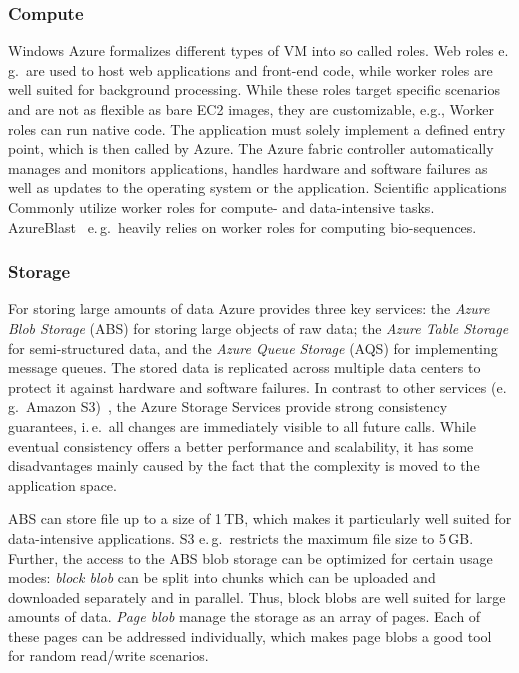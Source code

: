 \documentclass[conference,final]{IEEEtran}
\begin{document}
\subsubsection{Compute}

Windows Azure formalizes different types of VM into so called
roles. Web roles e.\,g.\ are used to host web applications and
front-end code, while worker roles are well suited for background
processing. While these roles target specific scenarios and are not as
flexible as bare EC2 images, they are customizable, %
e.g., Worker roles can run native code. The application must solely
implement a defined entry point, which is then called by Azure. The
Azure fabric controller automatically manages and monitors
applications, handles hardware and software failures as well as
updates to the operating system or the application.  Scientific
applications Commonly utilize worker roles for compute- and
data-intensive tasks. AzureBlast~\cite{azure_blast} e.\,g.\ heavily
relies on worker roles for computing bio-sequences.

\subsubsection{Storage}

For storing large amounts of data Azure provides three key services:
the \emph{Azure Blob Storage} (ABS) for storing large objects of raw
data; the \emph{Azure Table Storage} for semi-structured data, and the
\emph{Azure Queue Storage} (AQS) for implementing message queues.  The
stored data is %
replicated across multiple data centers to protect it against hardware
and software failures. In contrast to other services (e.\,g.\ Amazon
S3)~\cite{1294281}, the Azure Storage Services provide strong
consistency guarantees, i.\,e.\ all changes are immediately visible to
all future calls. While eventual consistency offers a better
performance and scalability, it has some disadvantages mainly caused
by the fact that the complexity is moved to the application space.

ABS can store file up to a size of 1\,TB, which makes it particularly
well suited for data-intensive applications. S3 e.\,g.\ restricts the
maximum file size to 5\,GB. Further, the access to the ABS blob
storage can be optimized for certain usage modes: \emph{block blob}
can be split into chunks which can be uploaded and downloaded
separately and in parallel.  Thus, block blobs are well suited for
large amounts of data. \emph{Page blob} manage the storage as an array
of pages. Each of these pages can be addressed individually, which
makes page blobs a good tool for random read/write scenarios.
\end{document}
